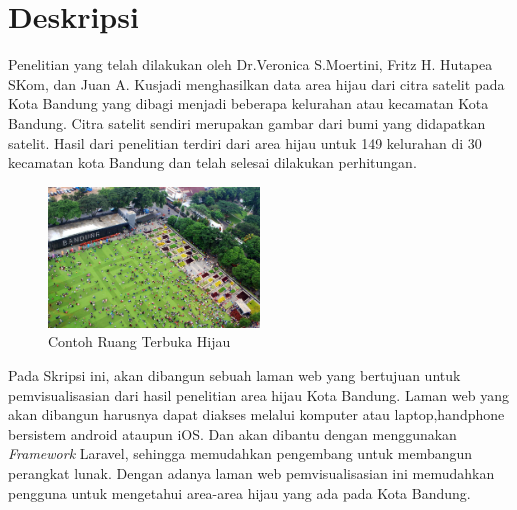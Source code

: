 \documentclass[a4paper,twoside]{article}
\begin{document}
\title{\@judultopik}
\author{\nama \textendash \@npm} 

\newcommand{\nama}{Bosnich Timothy Bonsaleng}
\newcommand{\@npm}{2017730086}
\newcommand{\@judultopik}{Pemvisualisasi Hasil Penelitian Area Hijau Kelurahan} %
\newcommand{\jumpemb}{1} %
\newcommand{\tanggal}{06/03/2023}


\maketitle


\section{Deskripsi}
Penelitian yang telah dilakukan oleh Dr.Veronica S.Moertini, Fritz H. Hutapea SKom, dan Juan A. Kusjadi menghasilkan data area hijau dari citra satelit pada Kota Bandung yang dibagi menjadi beberapa kelurahan atau kecamatan Kota Bandung. Citra satelit sendiri merupakan gambar dari bumi yang didapatkan satelit. Hasil dari penelitian terdiri dari area hijau untuk 149 kelurahan di 30 kecamatan kota Bandung dan telah selesai dilakukan perhitungan.\\

\begin{figure}[h]
	\centering
	\includegraphics[width=0.5\textwidth]{ruang terbuka hijau.jpg}
	\caption{Contoh Ruang Terbuka Hijau}
\end{figure}
 
Pada Skripsi ini, akan dibangun sebuah laman web yang bertujuan untuk pemvisualisasian dari hasil penelitian area hijau Kota Bandung. Laman web yang akan dibangun harusnya dapat diakses melalui komputer atau laptop,handphone bersistem android ataupun iOS. Dan akan dibantu dengan menggunakan \emph{Framework} Laravel, sehingga memudahkan pengembang untuk membangun perangkat lunak. Dengan adanya laman web pemvisualisasian ini memudahkan pengguna untuk mengetahui area-area hijau yang ada pada Kota Bandung.
\end{document}
